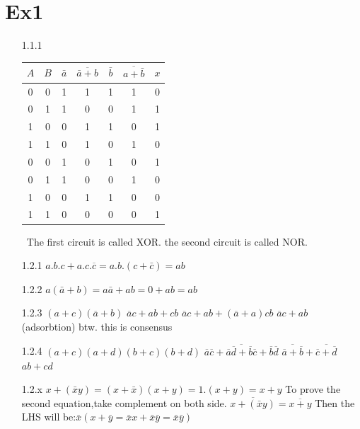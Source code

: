 \documentclass[10pt,twoside,a4paper]{article}
\begin{document}
\section{Ex1}
\begin{enumerate}
\item[1.1.1]
\begin{tabular}{ccccccc}
$A$ & $B$ & $\bar{a}$ & $\overline{\bar{a}+b}$ & $\bar{b}$ & $\overline{a+\bar{b}}$ & $x$\\
\hline
0&0&1&1&1&1&0\\
0&1&1&0&0&1&1\\
1&0&0&1&1&0&1\\
1&1&0&1&0&1&0\\
\hline
0&0&1&0&1&0&1\\
0&1&1&0&0&1&0\\
1&0&0&1&1&0&0\\
1&1&0&0&0&0&1\\
\end{tabular}\newline\
The first circuit is called XOR.\newline
the second circuit is called NOR.\newline
\item[1.2.1] $a.b.c+a.c.\overline{c}=a.b.(c+\bar{c})=ab$ \newline

\item[1.2.2] $a(\bar{a}+b)=a\bar{a}+ab=0+ab=ab$ \newline
\item[1.2.3] $(a+c)(\overline{a}+b)$ \newline
	  $\overline{a}c+ab+cb$	\newline
	  $\overline{a}c+ab+(\overline{a}+a)cb$\newline 
	  $\overline{a}c+ab$ (adsorbtion) btw. this is consensus \newline
\item[1.2.4] $(a+c)(a+d)(b+c)(b+d)$ \newline
	  $\overline{\overline{a}\overline{c}+\overline{a}\overline{d}+\overline{b}\overline{c}+\overline{b}\overline{d}}$ \newline
	  $\overline{\overline{a}+\overline{b}}+\overline{\overline{c}+\overline{d}}$\newline
	  $ab+cd$
\item[1.2.x]
$x+(\bar{x}y)=(x+\bar{x})(x+y)=1.(x+y)=x+y$\newline
To prove the second equation,take complement on both side.
$\overline{x+(\bar{x}y)}=\overline{x+y}$\newline
Then the LHS will be:$\bar{x}(x+\bar{y}=\bar{x}x+\bar{x}\bar{y}=\bar{x}\bar{y})$\newline


\end{enumerate}
\end{document}

